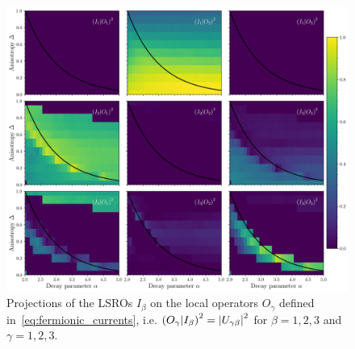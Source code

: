\begin{figure}[htbp]
  \centering
  \includegraphics[width=\linewidth]{Figures/projections.jpg}
  \caption{Projections of the LSROs \(I_{\beta}\) on the local operators \(O_{\gamma}\) defined in~\eqref{eq:fermionic_currents},
  i.e. \(\left(O_{\gamma} \middle| I_{\beta}\right)^2 = \abs{U_{\gamma\beta}}^2\) for \(\beta = 1,2,3\) and \(\gamma = 1,2,3\).}
  \label{fig:projections}
\end{figure}

